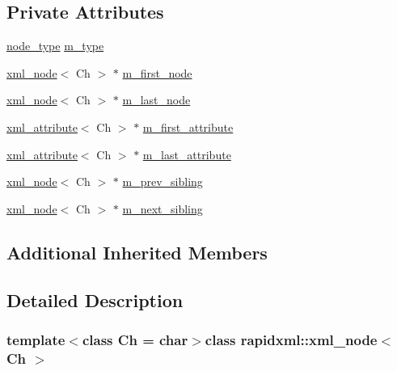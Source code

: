 \subsection*{Private Attributes}
\begin{DoxyCompactItemize}
\item 
\hyperlink{namespacerapidxml_abb456db38f7efb746c4330eed6072a7c}{node\+\_\+type} \hyperlink{singletonrapidxml_1_1xml__node_a33912a5ceef221d662bbac67c70e1397}{m\+\_\+type}
\item 
\hyperlink{singletonrapidxml_1_1xml__node}{xml\+\_\+node}$<$ Ch $>$ $\ast$ \hyperlink{singletonrapidxml_1_1xml__node_a3c2a0b286724865b5c000e3333f60d4a}{m\+\_\+first\+\_\+node}
\item 
\hyperlink{singletonrapidxml_1_1xml__node}{xml\+\_\+node}$<$ Ch $>$ $\ast$ \hyperlink{singletonrapidxml_1_1xml__node_adc211d26cfea2ba6fb51adb27694ff09}{m\+\_\+last\+\_\+node}
\item 
\hyperlink{singletonrapidxml_1_1xml__attribute}{xml\+\_\+attribute}$<$ Ch $>$ $\ast$ \hyperlink{singletonrapidxml_1_1xml__node_a5f7caf8d72d8fae634be6eb744ad8538}{m\+\_\+first\+\_\+attribute}
\item 
\hyperlink{singletonrapidxml_1_1xml__attribute}{xml\+\_\+attribute}$<$ Ch $>$ $\ast$ \hyperlink{singletonrapidxml_1_1xml__node_ad82c1bdd1a5c94927cf8a627f18953b9}{m\+\_\+last\+\_\+attribute}
\item 
\hyperlink{singletonrapidxml_1_1xml__node}{xml\+\_\+node}$<$ Ch $>$ $\ast$ \hyperlink{singletonrapidxml_1_1xml__node_a571f24c86107f8442f46a514a7cc5d0d}{m\+\_\+prev\+\_\+sibling}
\item 
\hyperlink{singletonrapidxml_1_1xml__node}{xml\+\_\+node}$<$ Ch $>$ $\ast$ \hyperlink{singletonrapidxml_1_1xml__node_a202e84dfdd34cb65557b64e31b7e205a}{m\+\_\+next\+\_\+sibling}
\end{DoxyCompactItemize}
\subsection*{Additional Inherited Members}


\subsection{Detailed Description}
\subsubsection*{template$<$class Ch = char$>$class rapidxml\+::xml\+\_\+node$<$ Ch $>$}

